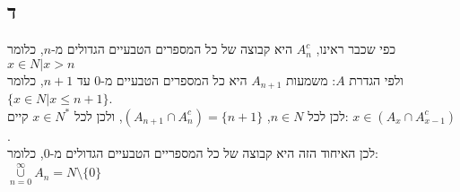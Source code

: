 \documentclass{article}
\begin{document}
\subsection{ד}
כפי שכבר ראינו, $A_n^{c}$ היא קבוצה של כל המספרים הטבעיים הגדולים מ-$n$, כלומר ${x \in  N | x > n}$\\
ולפי הגדרת $A$: משמעות $A_{n+1}$ היא כל המספרים הטבעיים מ-0 עד $n+1$, כלומר $\{x \in N | x \le n+1\}$.\\
לכן לכל $n \in N$, $(A_{n+1} \cap A_n^{c}) = \{n+1\}$, ולכן לכל $x \in N^{*}$ 
קיים: $x \in  (A_{x} \cap A_{x-1}^{c})$.\\
לכן האיחוד הזה היא קבוצה של כל המספריים הטבעיים הגדולים מ-0, כלומר:\\
$ \underset{n=0}{\overset{\infty}{\cup }} A_n = N \setminus \{0\}$
\end{document}

